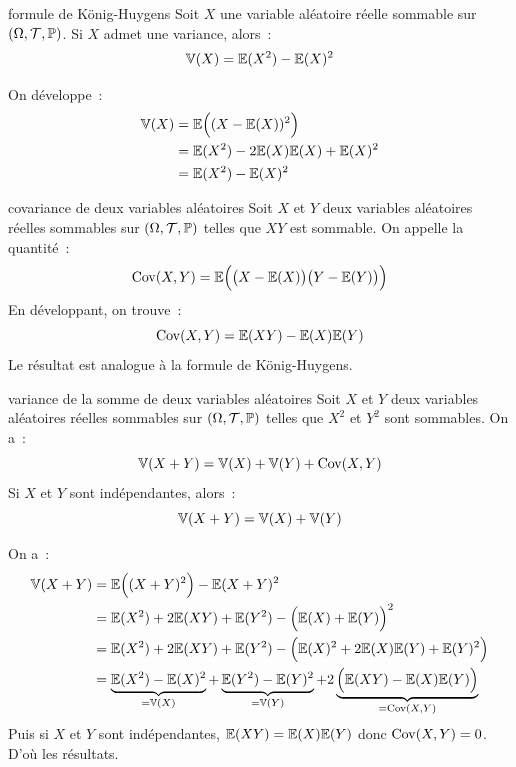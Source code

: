 \begin{proposition}{}{formule de König-Huygens}
    Soit $X$ une variable aléatoire réelle sommable sur $(\Omega, \mathcal{T}, \mathbb{P})$. Si $X$ admet une variance, alors~:
    $$\mathbb{V}(X) = \mathbb{E}(X^2) - \mathbb{E}(X)^2$$
\end{proposition}

\begin{demonstration}
    On développe~:
    \begin{align*}
        \mathbb{V}(X) &= \mathbb{E}\Big((X - \mathbb{E}(X))^2\Big)\\
        &= \mathbb{E}(X^2) - 2\mathbb{E}(X)\mathbb{E}(X) + \mathbb{E}(X)^2\\
        &= \mathbb{E}(X^2) - \mathbb{E}(X)^2
    \end{align*}
\end{demonstration}

\begin{definition}{}{covariance de deux variables aléatoires}
    Soit $X$ et $Y$ deux variables aléatoires réelles sommables sur $(\Omega, \mathcal{T}, \mathbb{P})$ telles que $XY$ est sommable. On appelle  la quantité~:
    $$\mathrm{Cov}(X,Y) = \mathbb{E}\Big(\big(X - \mathbb{E}(X)\big)\big(Y - \mathbb{E}(Y)\big)\Big)$$
    En développant, on trouve~:
    $$\mathrm{Cov}(X,Y) = \mathbb{E}(XY) - \mathbb{E}(X)\mathbb{E}(Y)$$
    Le résultat est analogue à la formule de König-Huygens.
\end{definition}

\begin{proposition}{}{variance de la somme de deux variables aléatoires}
    Soit $X$ et $Y$ deux variables aléatoires réelles sommables sur $(\Omega, \mathcal{T}, \mathbb{P})$ telles que $X^2$ et $Y^2$ sont sommables. On a~:
    $$\mathbb{V}(X+Y) = \mathbb{V}(X) + \mathbb{V}(Y) + \mathrm{Cov}(X,Y)$$
    Si $X$ et $Y$ sont indépendantes, alors~:
    $$\mathbb{V}(X+Y) = \mathbb{V}(X) + \mathbb{V}(Y)$$
\end{proposition}

\begin{demonstration}
    On a~:
    \begin{align*}
        \mathbb{V}(X+Y) &= \mathbb{E}\Big((X+Y)^2\Big) - \mathbb{E}(X+Y)^2\\
        &= \mathbb{E}(X^2) + 2\mathbb{E}(XY) + \mathbb{E}(Y^2) - \Big(\mathbb{E}(X) + \mathbb{E}(Y)\Big)^2\\
        &= \mathbb{E}(X^2) + 2\mathbb{E}(XY) + \mathbb{E}(Y^2) - \Big(\mathbb{E}(X)^2 + 2\mathbb{E}(X)\mathbb{E}(Y) + \mathbb{E}(Y)^2\Big)\\
        &= \underbrace{\mathbb{E}(X^2) - \mathbb{E}(X)^2}_{=\mathbb{V}(X)} + \underbrace{\mathbb{E}(Y^2) - \mathbb{E}(Y)^2}_{=\mathbb{V}(Y)} + 2\underbrace{\Big(\mathbb{E}(XY) - \mathbb{E}(X)\mathbb{E}(Y)\Big)}_{=\mathrm{Cov}(X,Y)}\\
    \end{align*}
    Puis si $X$ et $Y$ sont indépendantes, $\mathbb{E}(XY) = \mathbb{E}(X)\mathbb{E}(Y)$ donc $\mathrm{Cov}(X,Y) = 0$. D'où les résultats.
\end{demonstration}

